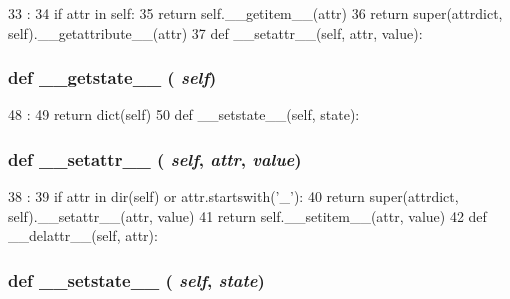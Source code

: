 \begin{DoxyCode}
33                                :
34         if attr in self:
35             return self.__getitem__(attr)
36         return super(attrdict, self).__getattribute__(attr)
37 
    def __setattr__(self, attr, value):
\end{DoxyCode}
\hypertarget{classm5_1_1util_1_1attrdict_1_1attrdict_a8a97f085cdc730415d3a782b40a3c31e}{
\subsubsection[{\_\-\_\-getstate\_\-\_\-}]{\setlength{\rightskip}{0pt plus 5cm}def \_\-\_\-getstate\_\-\_\- ( {\em self})}}
\label{classm5_1_1util_1_1attrdict_1_1attrdict_a8a97f085cdc730415d3a782b40a3c31e}



\begin{DoxyCode}
48                           :
49         return dict(self)
50 
    def __setstate__(self, state):
\end{DoxyCode}
\hypertarget{classm5_1_1util_1_1attrdict_1_1attrdict_a6287b7a16286568d5442b6e2e90215b5}{
\subsubsection[{\_\-\_\-setattr\_\-\_\-}]{\setlength{\rightskip}{0pt plus 5cm}def \_\-\_\-setattr\_\-\_\- ( {\em self}, \/   {\em attr}, \/   {\em value})}}
\label{classm5_1_1util_1_1attrdict_1_1attrdict_a6287b7a16286568d5442b6e2e90215b5}



\begin{DoxyCode}
38                                       :
39         if attr in dir(self) or attr.startswith('_'):
40             return super(attrdict, self).__setattr__(attr, value)
41         return self.__setitem__(attr, value)
42 
    def __delattr__(self, attr):
\end{DoxyCode}
\hypertarget{classm5_1_1util_1_1attrdict_1_1attrdict_a2157e3c1b2bcbbc208f96575e0b2029f}{
\subsubsection[{\_\-\_\-setstate\_\-\_\-}]{\setlength{\rightskip}{0pt plus 5cm}def \_\-\_\-setstate\_\-\_\- ( {\em self}, \/   {\em state})}}
\label{classm5_1_1util_1_1attrdict_1_1attrdict_a2157e3c1b2bcbbc208f96575e0b2029f}



